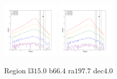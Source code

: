 \documentclass[12pt,prd]{article}
\begin{document}
\begin{figure}[h!]
\includegraphics[width=0.24\textwidth]{../figures/scanning_plotsgaiascan_l315_0_b66_4_ra197_7_dec4_0_npy_16.pdf}
\includegraphics[width=0.24\textwidth]{../figures/scanning_plotsgaiascan_l315_0_b66_4_ra197_7_dec4_0_npy_17.pdf}
\caption{Region l$315.0$ b$66.4$ ra$197.7$ dec$4.0$}
\end{figure}
\end{document}
